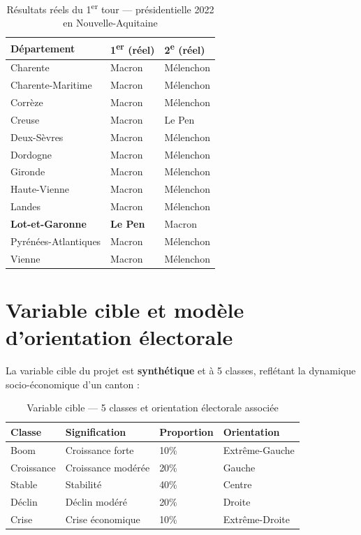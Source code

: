 \begin{table}[H]
\centering
\caption{Résultats réels du 1\textsuperscript{er} tour — présidentielle 2022 en Nouvelle-Aquitaine}
\label{tab:resultats_reels}
\begin{tabular}{lll}
\toprule
\textbf{Département} & \textbf{1\textsuperscript{er} (réel)} & \textbf{2\textsuperscript{e} (réel)} \\
\midrule
Charente            & Macron  & Mélenchon \\
Charente-Maritime   & Macron  & Mélenchon \\
Corrèze             & Macron  & Mélenchon \\
Creuse              & Macron  & Le Pen \\
Deux-Sèvres         & Macron  & Mélenchon \\
Dordogne            & Macron  & Mélenchon \\
Gironde             & Macron  & Mélenchon \\
Haute-Vienne        & Macron  & Mélenchon \\
Landes              & Macron  & Mélenchon \\
\textbf{Lot-et-Garonne} & \textbf{Le Pen} & Macron \\
Pyrénées-Atlantiques & Macron & Mélenchon \\
Vienne              & Macron  & Mélenchon \\
\bottomrule
\end{tabular}
\end{table}

\section{Variable cible et modèle d'orientation électorale}

La variable cible du projet est \textbf{synthétique} et à 5 classes, reflétant la
dynamique socio-économique d'un canton :

\begin{table}[H]
\centering
\caption{Variable cible — 5 classes et orientation électorale associée}
\label{tab:classes}
\begin{tabular}{llll}
\toprule
\textbf{Classe} & \textbf{Signification} & \textbf{Proportion} & \textbf{Orientation} \\
\midrule
Boom        & Croissance forte  & 10\% & Extrême-Gauche \\
Croissance  & Croissance modérée & 20\% & Gauche \\
Stable      & Stabilité         & 40\% & Centre \\
Déclin      & Déclin modéré     & 20\% & Droite \\
Crise       & Crise économique  & 10\% & Extrême-Droite \\
\bottomrule
\end{tabular}
\end{table}

